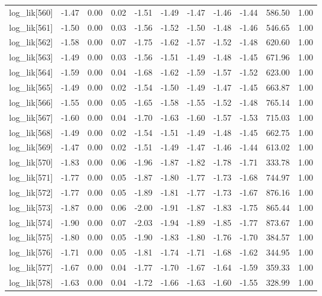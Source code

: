 \begin{table}[ht]
\begin{tabular}{rrrrrrrrrrr}
  log\_lik[560] & -1.47 & 0.00 & 0.02 & -1.51 & -1.49 & -1.47 & -1.46 & -1.44 & 586.50 & 1.00 \\ 
  log\_lik[561] & -1.50 & 0.00 & 0.03 & -1.56 & -1.52 & -1.50 & -1.48 & -1.46 & 546.65 & 1.00 \\ 
  log\_lik[562] & -1.58 & 0.00 & 0.07 & -1.75 & -1.62 & -1.57 & -1.52 & -1.48 & 620.60 & 1.00 \\ 
  log\_lik[563] & -1.49 & 0.00 & 0.03 & -1.56 & -1.51 & -1.49 & -1.48 & -1.45 & 671.96 & 1.00 \\ 
  log\_lik[564] & -1.59 & 0.00 & 0.04 & -1.68 & -1.62 & -1.59 & -1.57 & -1.52 & 623.00 & 1.00 \\ 
  log\_lik[565] & -1.49 & 0.00 & 0.02 & -1.54 & -1.50 & -1.49 & -1.47 & -1.45 & 663.87 & 1.00 \\ 
  log\_lik[566] & -1.55 & 0.00 & 0.05 & -1.65 & -1.58 & -1.55 & -1.52 & -1.48 & 765.14 & 1.00 \\ 
  log\_lik[567] & -1.60 & 0.00 & 0.04 & -1.70 & -1.63 & -1.60 & -1.57 & -1.53 & 715.03 & 1.00 \\ 
  log\_lik[568] & -1.49 & 0.00 & 0.02 & -1.54 & -1.51 & -1.49 & -1.48 & -1.45 & 662.75 & 1.00 \\ 
  log\_lik[569] & -1.47 & 0.00 & 0.02 & -1.51 & -1.49 & -1.47 & -1.46 & -1.44 & 613.02 & 1.00 \\ 
  log\_lik[570] & -1.83 & 0.00 & 0.06 & -1.96 & -1.87 & -1.82 & -1.78 & -1.71 & 333.78 & 1.00 \\ 
  log\_lik[571] & -1.77 & 0.00 & 0.05 & -1.87 & -1.80 & -1.77 & -1.73 & -1.68 & 744.97 & 1.00 \\ 
  log\_lik[572] & -1.77 & 0.00 & 0.05 & -1.89 & -1.81 & -1.77 & -1.73 & -1.67 & 876.16 & 1.00 \\ 
  log\_lik[573] & -1.87 & 0.00 & 0.06 & -2.00 & -1.91 & -1.87 & -1.83 & -1.75 & 865.44 & 1.00 \\ 
  log\_lik[574] & -1.90 & 0.00 & 0.07 & -2.03 & -1.94 & -1.89 & -1.85 & -1.77 & 873.67 & 1.00 \\ 
  log\_lik[575] & -1.80 & 0.00 & 0.05 & -1.90 & -1.83 & -1.80 & -1.76 & -1.70 & 384.57 & 1.00 \\ 
  log\_lik[576] & -1.71 & 0.00 & 0.05 & -1.81 & -1.74 & -1.71 & -1.68 & -1.62 & 344.95 & 1.00 \\ 
  log\_lik[577] & -1.67 & 0.00 & 0.04 & -1.77 & -1.70 & -1.67 & -1.64 & -1.59 & 359.33 & 1.00 \\ 
  log\_lik[578] & -1.63 & 0.00 & 0.04 & -1.72 & -1.66 & -1.63 & -1.60 & -1.55 & 328.99 & 1.00 \\ 

\end{tabular}
\end{table}
